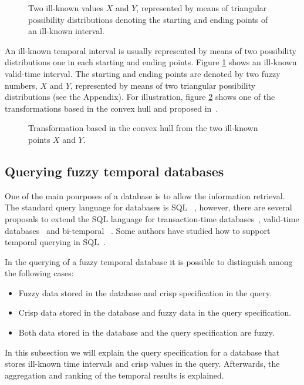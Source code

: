 \begin{figure}
\centering

\caption{Two ill-known values $X$ and $Y$, represented by means of triangular possibility distributions denoting the starting and ending points of an ill-known interval. }
\label{fig:interval}
\end{figure}


An ill-known temporal interval is usually represented by means of two possibility distributions one in each starting and ending points. Figure \ref{fig:interval} shows an ill-known valid-time interval. The starting and ending points are denoted by two fuzzy numbers, $X$ and $Y$, represented by means of two triangular possibility distributions (see the Appendix). For illustration, figure \ref{fig:convexhull} shows one of the transformations based in the convex hull and proposed in~\cite{garrido2009}.

\begin{figure}
\centering

\caption{Transformation based in the convex hull from the two ill-known points $X$ and $Y$. }
\label{fig:convexhull}
\end{figure}

\subsection{Querying fuzzy temporal databases}
\label{subsec:querying-time-intervals}
One of the main pourposes of a database is to allow the information retrieval. The standard query language for databases is SQL ~\cite{Mel93}, however, there are several proposals to extend the SQL language for transaction-time databases~\cite{Sarda90}, valid-time databases~\cite{gad92} and bi-temporal ~\cite{TSQL}. Some authors have studied how to support temporal querying in SQL~\cite{Snodgrass98}.

In the querying of a fuzzy temporal database it is possible to distinguish among the following cases:

\begin{itemize}
\item
Fuzzy data stored in the database and crisp specification in the query.
\item
Crisp data stored in the database and fuzzy data in the query specification.
\item
Both data stored in the database and the query specification are fuzzy.
\end{itemize}
In this subsection we will explain the query specification for a database that stores ill-known time intervals and crisp values in the query. Afterwards, the aggregation and ranking of the temporal results is explained.

